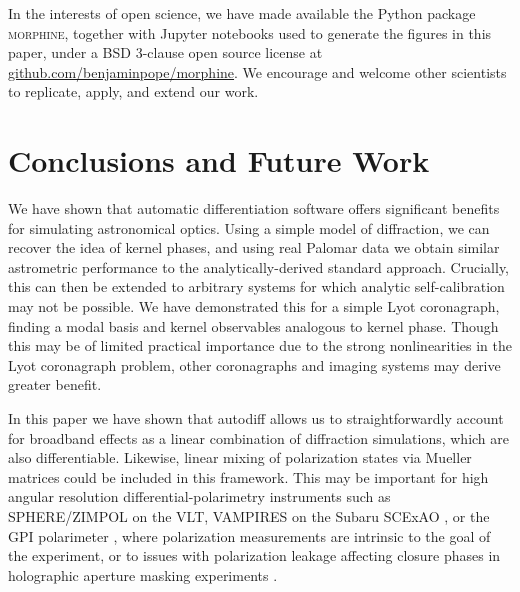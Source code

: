 \documentclass[modern]{aastex63}
\begin{document}
In the interests of open science, we have made available the Python package \textsc{morphine}, together with Jupyter notebooks used to generate the figures in this paper, under a BSD 3-clause open source license at \href{https://github.com/benjaminpope/morphine}{github.com/benjaminpope/morphine}. We encourage and welcome other scientists to replicate, apply, and extend our work.

\section{Conclusions and Future Work}
\label{sec:conclusions}

We have shown that automatic differentiation software offers significant benefits for simulating astronomical optics. Using a simple model of diffraction, we can recover the idea of kernel phases, and using real Palomar data we obtain similar astrometric performance to the analytically-derived standard approach. Crucially, this can then be extended to arbitrary systems for which analytic self-calibration may not be possible. We have demonstrated this for a simple Lyot coronagraph, finding a modal basis and kernel observables analogous to kernel phase. Though this may be of limited practical importance due to the strong nonlinearities in the Lyot coronagraph problem, other coronagraphs and imaging systems may derive greater benefit.

In this paper we have shown that autodiff allows us to straightforwardly account for broadband effects as a linear combination of diffraction simulations, which are also differentiable. Likewise, linear mixing of polarization states via Mueller matrices could be included in this framework. This may be important for high angular resolution differential-polarimetry instruments such as SPHERE/ZIMPOL \citep{zimpol} on the VLT, VAMPIRES on the Subaru SCExAO \citep{vampires}, or the GPI polarimeter \citep{gpipol}, where polarization measurements are intrinsic to the goal of the experiment, or to issues with polarization leakage affecting closure phases in holographic aperture masking experiments \citep[e.g.][]{doelman18}.
\end{document}
